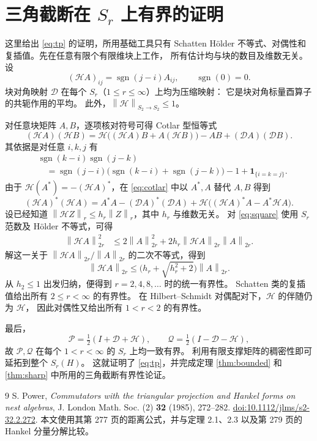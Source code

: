 \documentclass[UTF8,11pt,a4paper,fontset=fandol]{ctexart}
\theoremstyle{remark}
\newcommand{\PP}{\mathcal P}
\newcommand{\QQ}{\mathcal Q}
\newcommand{\DD}{\mathcal D}
\newcommand{\TriH}{\mathcal H}
\newcommand{\norm}[1]{\left\lVert #1\right\rVert}
\numberwithin{equation}{section}
\begin{document}
\appendix
\section{三角截断在 \texorpdfstring{$S_r$}{Sr} 上有界的证明}

这里给出 \eqref{eq:tp} 的证明，所用基础工具只有 Schatten H\"older
不等式、对偶性和复插值。先在任意有限个有限维块上工作，
所有估计均与块的数目及维数无关。
设
\[
 (\TriH A)_{ij}=\operatorname{sgn}(j-i)A_{ij},\qquad
 \operatorname{sgn}(0)=0.
\]
块对角映射 $\DD$ 在每个 $S_r$（$1\leq r\leq\infty$）上均为压缩映射：
它是块对角标量酉算子的共轭作用的平均。
此外，$\norm{\TriH}_{S_2\to S_2}\leq1$。

\medskip
对任意块矩阵 $A,B$，逐项核对符号可得 Cotlar 型恒等式
\begin{equation}\label{eq:cotlar}
 (\TriH A)(\TriH B)
 =\TriH\bigl((\TriH A)B+A(\TriH B)\bigr)-AB+(\DD A)(\DD B).
\end{equation}
其依据是对任意 $i,k,j$ 有
\begin{align*}
 &\operatorname{sgn}(k-i)\operatorname{sgn}(j-k)\\
 &\quad=\operatorname{sgn}(j-i)
   \bigl(\operatorname{sgn}(k-i)+\operatorname{sgn}(j-k)\bigr)
    -1+\mathbf1_{\{i=k=j\}}.
\end{align*}
由于 $\TriH(A^*)=-(\TriH A)^*$，在 \eqref{eq:cotlar} 中以 $A^*,A$
替代 $A,B$ 得到
\begin{equation}\label{eq:square}
 (\TriH A)^*(\TriH A)
 =A^*A-(\DD A)^*(\DD A)
   +\TriH\bigl((\TriH A)^*A-A^*\TriH A\bigr).
\end{equation}
设已经知道 $\norm{\TriH Z}_r\leq h_r\norm Z_r$，其中 $h_r$ 与维数无关。
对 \eqref{eq:square} 使用 $S_r$ 范数及 H\"older 不等式，可得
\begin{align*}
 \norm{\TriH A}_{2r}^{2}
 &\leq 2\norm A_{2r}^{2}
       +2h_r\norm{\TriH A}_{2r}\norm A_{2r}.
\end{align*}
解这一关于 $\norm{\TriH A}_{2r}/\norm A_{2r}$ 的二次不等式，得到
\[
 \norm{\TriH A}_{2r}\leq
 \bigl(h_r+\sqrt{h_r^2+2}\bigr)\norm A_{2r}.
\]
从 $h_2\leq1$ 出发归纳，便得到 $r=2,4,8,\ldots$ 时的统一有界性。
Schatten 类的复插值给出所有 $2\leq r<\infty$ 的有界性。
在 Hilbert--Schmidt 对偶配对下，$\TriH$ 的伴随仍为 $\TriH$，
因此对偶性又给出所有 $1<r<2$ 的有界性。

最后，
\[
 \PP=\tfrac12(I+\DD+\TriH),\qquad
 \QQ=\tfrac12(I-\DD-\TriH),
\]
故 $\PP,\QQ$ 在每个 $1<r<\infty$ 的 $S_r$ 上均一致有界。
利用有限支撑矩阵的稠密性即可延拓到整个 $S_r(H)$。
这就证明了 \eqref{eq:tp}，并完成定理 \ref{thm:bounded} 和
\ref{thm:sharp} 中所用的三角截断有界性论证。

\begin{thebibliography}{9}
S. Power,
\emph{Commutators with the triangular projection and Hankel forms on nest algebras},
J. London Math. Soc. (2) \textbf{32} (1985), 272--282.
\href{https://doi.org/10.1112/jlms/s2-32.2.272}{doi:10.1112/jlms/s2-32.2.272}.
本文使用其第 277 页的距离公式，并与定理 2.1、2.3
以及第 279 页的 Hankel 分量分解比较。
\end{thebibliography}
\end{document}
